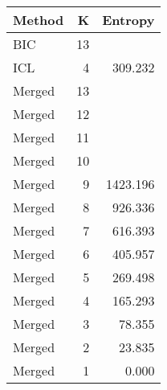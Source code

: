 \begin{center} 
\begin{tabular}{lrr}
 Method & K & Entropy \\ 
  \hline
\hline
BIC &   13 &  \\ 
  ICL &    4 & 309.232 \\ 
  Merged &   13 &  \\ 
  Merged &   12 &  \\ 
  Merged &   11 &  \\ 
  Merged &   10 &  \\ 
  Merged &    9 & 1423.196 \\ 
  Merged &    8 & 926.336 \\ 
  Merged &    7 & 616.393 \\ 
  Merged &    6 & 405.957 \\ 
  Merged &    5 & 269.498 \\ 
  Merged &    4 & 165.293 \\ 
  Merged &    3 & 78.355 \\ 
  Merged &    2 & 23.835 \\ 
  Merged &    1 & 0.000 \\ 
  \end{tabular}
\end{center} 
